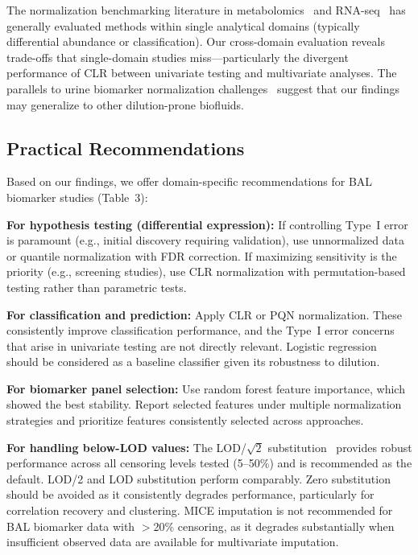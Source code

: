 \documentclass[12pt]{article}
\begin{document}
The normalization benchmarking literature in metabolomics~\cite{Lu2025,Wang2018,Li2017,Valikangas2018,Chawade2014,VanDenBerg2006} and RNA-seq~\cite{Risso2014} has generally evaluated methods within single analytical domains (typically differential abundance or classification). Our cross-domain evaluation reveals trade-offs that single-domain studies miss---particularly the divergent performance of CLR between univariate testing and multivariate analyses. The parallels to urine biomarker normalization challenges~\cite{Waikar2010} suggest that our findings may generalize to other dilution-prone biofluids.

\subsection{Practical Recommendations}

Based on our findings, we offer domain-specific recommendations for BAL biomarker studies (Table~3):

\textbf{For hypothesis testing (differential expression):} If controlling Type~I error is paramount (e.g., initial discovery requiring validation), use unnormalized data or quantile normalization with FDR correction. If maximizing sensitivity is the priority (e.g., screening studies), use CLR normalization with permutation-based testing rather than parametric tests.

\textbf{For classification and prediction:} Apply CLR or PQN normalization. These consistently improve classification performance, and the Type~I error concerns that arise in univariate testing are not directly relevant. Logistic regression should be considered as a baseline classifier given its robustness to dilution.

\textbf{For biomarker panel selection:} Use random forest feature importance, which showed the best stability. Report selected features under multiple normalization strategies and prioritize features consistently selected across approaches.

\textbf{For handling below-LOD values:} The LOD/$\sqrt{2}$ substitution~\cite{Hornung1990} provides robust performance across all censoring levels tested (5--50\%) and is recommended as the default. LOD/2 and LOD substitution perform comparably. Zero substitution should be avoided as it consistently degrades performance, particularly for correlation recovery and clustering. MICE imputation is not recommended for BAL biomarker data with $>$20\% censoring, as it degrades substantially when insufficient observed data are available for multivariate imputation.
\end{document}
